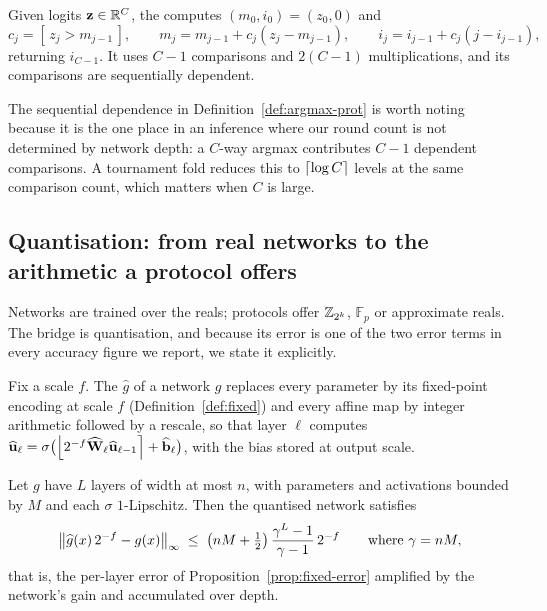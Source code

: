 \begin{definition}
\label{def:argmax-prot}
Given logits $\mathbf{z} \in \mathbb{R}^{C}$, the  computes
$(m_0,i_0) = (z_0,0)$ and
\[
  c_j = [\,z_j > m_{j-1}\,], \qquad
  m_j = m_{j-1} + c_j (z_j - m_{j-1}), \qquad
  i_j = i_{j-1} + c_j (j - i_{j-1}),
\]
returning $i_{C-1}$. It uses $C-1$ comparisons and $2(C-1)$ multiplications, and
its comparisons are sequentially dependent.
\end{definition}

The sequential dependence in Definition~\ref{def:argmax-prot} is worth noting
because it is the one place in an inference where our round count is not
determined by network depth: a $C$-way argmax contributes $C-1$ dependent
comparisons. A tournament fold reduces this to $\left\lceil \log C \right\rceil$ levels at the same
comparison count, which matters when $C$ is large.

\subsection{Quantisation: from real networks to the arithmetic a protocol offers}
\label{sec:ml:quant}

Networks are trained over the reals; protocols offer $\mathbb{Z}_{2^k}$, $\mathbb{F}_p$ or
approximate reals. The bridge is quantisation, and because its error is one of the
two error terms in every accuracy figure we report, we state it explicitly.

\begin{definition}
\label{def:qnet}
Fix a scale $f$. The  $\widehat{g}$ of a network $g$
replaces every parameter by its fixed-point encoding at scale $f$
(Definition~\ref{def:fixed}) and every affine map by integer arithmetic followed
by a rescale, so that layer $\ell$ computes
$\widehat{\mathbf{u}}_\ell = \sigma\bigl(\left\lfloor 2^{-f}\widehat{\mathbf{W}}_\ell
\widehat{\mathbf{u}}_{\ell-1} \right\rceil + \widehat{\mathbf{b}}_\ell\bigr)$, with the bias
stored at output scale.
\end{definition}

\begin{proposition}
\label{prop:quant-error}
Let $g$ have $L$ layers of width at most $n$, with parameters and activations
bounded by $M$ and each $\sigma$ $1$-Lipschitz. Then the quantised network
satisfies
\[
  \left\lVert \widehat{g}(x)\,2^{-f} - g(x) \right\rVert_\infty \;\le\;
  \bigl(nM + \tfrac12\bigr)\,\frac{\gamma^{L}-1}{\gamma-1}\,2^{-f}
  \qquad\text{where } \gamma = nM,
\]
that is, the per-layer error of Proposition~\ref{prop:fixed-error} amplified by
the network's gain and accumulated over depth.
\end{proposition}

